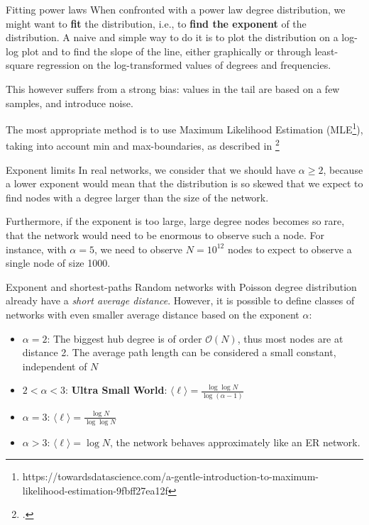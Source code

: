 \begin{textbox}{Fitting power laws}
    When confronted with a power law degree distribution, we might want to \textbf{fit} the distribution, i.e., to \textbf{find the exponent} of the distribution. A naive and simple way to do it is to plot the distribution on a log-log plot and to find the slope of the line, either graphically or through least-square regression on the log-transformed values of degrees and frequencies.

    This however suffers from a strong bias: values in the tail are based on a few samples, and introduce noise.

    The most appropriate method is to use Maximum Likelihood Estimation (MLE\footnote{https://towardsdatascience.com/a-gentle-introduction-to-maximum-likelihood-estimation-9fbff27ea12f}), taking into account min and max-boundaries, as described in \footcite{goldstein2004problems}
\end{textbox}


\begin{textbox}{Exponent limits}
    In real networks, we consider that we should have $\alpha\geq2$, because a lower exponent would mean that the distribution is so skewed that we expect to find nodes with a degree larger than the size of the network.

    Furthermore, if the exponent is too large, large degree nodes becomes so rare, that the network would need to be enormous to observe such a node. For instance, with $\alpha=5$, we need to observe $N=10^{12}$ nodes to expect to observe a single node of size 1000.
\end{textbox}


\begin{textbox}{Exponent and shortest-paths}
    Random networks with Poisson degree distribution already have a \textit{short average distance}. However, it is possible to define classes of networks with even smaller average distance based on the exponent $\alpha$:
    \begin{itemize}
        \item $\alpha=2$: The biggest hub degree is of order $\mathcal{O}(N)$, thus most nodes are at distance 2. The average path length can be considered a small constant, independent of $N$
        \item $2<\alpha<3$: \textbf{Ultra Small World}: $\langle \ell \rangle = \frac{\log \log N}{\log(\alpha-1)}$
        \item $\alpha=3$: $\langle \ell \rangle = \frac{ \log N}{\log \log N}$
        \item $\alpha>3$: $\langle \ell \rangle = \log N$, the network behaves approximately like an ER network.
    \end{itemize}
\end{textbox}


